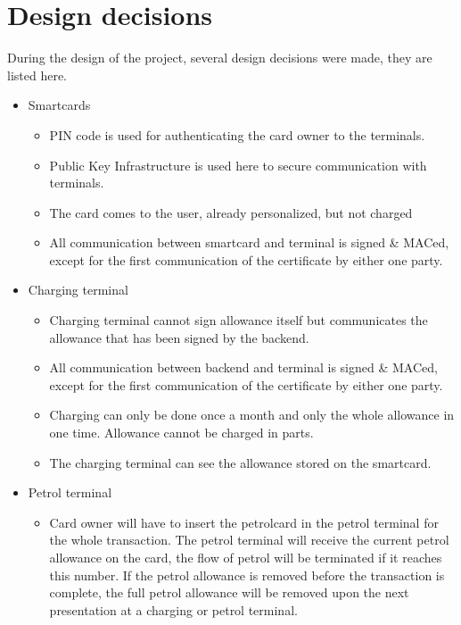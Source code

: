 \section{Design decisions}
During the design of the project, several design decisions were made, they are listed here.
\begin{itemize}
\item Smartcards
\begin{itemize}
\item PIN code is used for authenticating the card owner to the terminals.
\item Public Key Infrastructure is used here to secure communication with terminals.
\item The card comes to the user, already personalized, but not charged
\item All communication between smartcard and terminal is signed \& MACed, except for the first communication of the certificate by either one party.
\end{itemize}

\item Charging terminal
\begin{itemize}
\item Charging terminal cannot sign allowance itself but communicates the allowance that has been signed by the backend.
\item All communication between backend and terminal is signed \& MACed, except for the first communication of the certificate by either one party.
\item Charging can only be done once a month and only the whole allowance in one time. Allowance cannot be charged in parts.
\item The charging terminal can see the allowance stored on the smartcard.
\end{itemize}

\item Petrol terminal
\begin{itemize}
\item Card owner will have to insert the petrolcard in the petrol terminal for the whole transaction. The petrol terminal will receive the current petrol allowance on the card, the flow of petrol will be terminated if it reaches this number. If the petrol allowance is removed before the transaction is complete, the full petrol allowance will be removed upon the next presentation at a charging or petrol terminal. 


\end{itemize}
\end{itemize}
